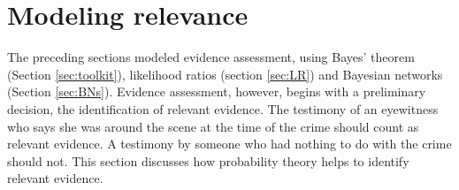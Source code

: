 \documentclass{article}
\begin{document}






















\section{Modeling relevance}\label{sec:relevance}



The preceding sections modeled evidence assessment, using  Bayes' theorem (Section \ref{sec:toolkit}), likelihood ratios (section \ref{sec:LR}) and   Bayesian networks (Section \ref{sec:BNs}). 
Evidence assessment, however, begins with a preliminary decision, the identification of relevant evidence. The testimony of an eyewitness who says she was around the scene at the time of the crime should count as relevant evidence. A testimony by someone who had nothing to do with the crime should not.  
%
This section discusses how probability theory helps to identify relevant evidence.
\end{document}
